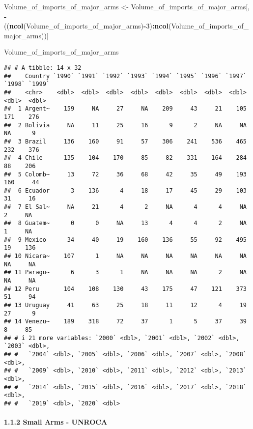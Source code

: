 \documentclass[
  11pt,
]{article}
\newenvironment{Shaded}{\begin{snugshade}}{\end{snugshade}}
\newcommand{\DecValTok}[1]{\textcolor[rgb]{0.00,0.00,0.81}{#1}}
\newcommand{\FunctionTok}[1]{\textcolor[rgb]{0.13,0.29,0.53}{\textbf{#1}}}
\newcommand{\NormalTok}[1]{#1}
\newcommand{\OtherTok}[1]{\textcolor[rgb]{0.56,0.35,0.01}{#1}}
\newcommand{\SpecialCharTok}[1]{\textcolor[rgb]{0.81,0.36,0.00}{\textbf{#1}}}
\begin{document}
\begin{Shaded}
\begin{Highlighting}[]
\NormalTok{Volume\_of\_imports\_of\_major\_arms }\OtherTok{\textless{}{-}}\NormalTok{ Volume\_of\_imports\_of\_major\_arms[, }\SpecialCharTok{{-}}\NormalTok{((}\FunctionTok{ncol}\NormalTok{(Volume\_of\_imports\_of\_major\_arms)}\SpecialCharTok{{-}}\DecValTok{3}\NormalTok{)}\SpecialCharTok{:}\FunctionTok{ncol}\NormalTok{(Volume\_of\_imports\_of\_major\_arms))]}

\NormalTok{Volume\_of\_imports\_of\_major\_arms}
\end{Highlighting}
\end{Shaded}

\begin{verbatim}
## # A tibble: 14 x 32
##    Country `1990` `1991` `1992` `1993` `1994` `1995` `1996` `1997` `1998` `1999`
##    <chr>    <dbl>  <dbl>  <dbl>  <dbl>  <dbl>  <dbl>  <dbl>  <dbl>  <dbl>  <dbl>
##  1 Argent~    159     NA     27     NA    209     43     21    105    171    276
##  2 Bolivia     NA     11     25     16      9      2     NA     NA     NA      9
##  3 Brazil     136    160     91     57    306    241    536    465    232    376
##  4 Chile      135    104    170     85     82    331    164    284     88    206
##  5 Colomb~     13     72     36     68     42     35     49    193    160     44
##  6 Ecuador      3    136      4     18     17     45     29    103     31     16
##  7 El Sal~     NA     21      4      2     NA      4      4     NA      2     NA
##  8 Guatem~      0      0     NA     13      4      4      2     NA      1     NA
##  9 Mexico      34     40     19    160    136     55     92    495     19    136
## 10 Nicara~    107      1     NA     NA     NA     NA     NA     NA     NA     NA
## 11 Paragu~      6      3      1     NA     NA     NA      2     NA     NA     NA
## 12 Peru       104    108    130     43    175     47    121    373     51     94
## 13 Uruguay     41     63     25     18     11     12      4     19     27      9
## 14 Venezu~    189    318     72     37      1      5     37     39      8     85
## # i 21 more variables: `2000` <dbl>, `2001` <dbl>, `2002` <dbl>, `2003` <dbl>,
## #   `2004` <dbl>, `2005` <dbl>, `2006` <dbl>, `2007` <dbl>, `2008` <dbl>,
## #   `2009` <dbl>, `2010` <dbl>, `2011` <dbl>, `2012` <dbl>, `2013` <dbl>,
## #   `2014` <dbl>, `2015` <dbl>, `2016` <dbl>, `2017` <dbl>, `2018` <dbl>,
## #   `2019` <dbl>, `2020` <dbl>
\end{verbatim}

\paragraph{1.1.2 Small Arms - UNROCA}\label{small-arms---unroca}
\end{document}
